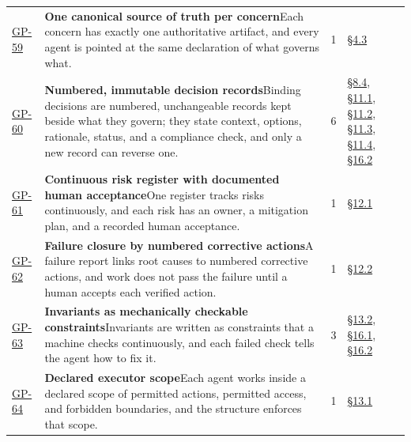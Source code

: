 \begin{longtable}{@{}p{} p{} r p{}@{}}
\hyperlink{gp-59}{GP-59}\hypertarget{gp-59}{} & \textbf{One canonical source of truth per concern}\newline Each concern has exactly one authoritative artifact, and every agent is pointed at the same declaration of what governs what.\rule[-\normalbaselineskip]{0pt}{0pt} & 1 & \hyperlink{nss-4.3}{\S4.3}\rule[-\normalbaselineskip]{0pt}{0pt} \\
\hyperlink{gp-60}{GP-60}\hypertarget{gp-60}{} & \textbf{Numbered, immutable decision records}\newline Binding decisions are numbered, unchangeable records kept beside what they govern; they state context, options, rationale, status, and a compliance check, and only a new record can reverse one.\rule[-\normalbaselineskip]{0pt}{0pt} & 6 & \hyperlink{nss-8.4}{\S8.4}, \hyperlink{nss-11.1}{\S11.1}, \hyperlink{nss-11.2}{\S11.2}, \hyperlink{nss-11.3}{\S11.3}, \hyperlink{nss-11.4}{\S11.4}, \hyperlink{nss-16.2}{\S16.2}\rule[-\normalbaselineskip]{0pt}{0pt} \\
\hyperlink{gp-61}{GP-61}\hypertarget{gp-61}{} & \textbf{Continuous risk register with documented human acceptance}\newline One register tracks risks continuously, and each risk has an owner, a mitigation plan, and a recorded human acceptance.\rule[-\normalbaselineskip]{0pt}{0pt} & 1 & \hyperlink{nss-12.1}{\S12.1}\rule[-\normalbaselineskip]{0pt}{0pt} \\
\hyperlink{gp-62}{GP-62}\hypertarget{gp-62}{} & \textbf{Failure closure by numbered corrective actions}\newline A failure report links root causes to numbered corrective actions, and work does not pass the failure until a human accepts each verified action.\rule[-\normalbaselineskip]{0pt}{0pt} & 1 & \hyperlink{nss-12.2}{\S12.2}\rule[-\normalbaselineskip]{0pt}{0pt} \\
\hyperlink{gp-63}{GP-63}\hypertarget{gp-63}{} & \textbf{Invariants as mechanically checkable constraints}\newline Invariants are written as constraints that a machine checks continuously, and each failed check tells the agent how to fix it.\rule[-\normalbaselineskip]{0pt}{0pt} & 3 & \hyperlink{nss-13.2}{\S13.2}, \hyperlink{nss-16.1}{\S16.1}, \hyperlink{nss-16.2}{\S16.2}\rule[-\normalbaselineskip]{0pt}{0pt} \\
\hyperlink{gp-64}{GP-64}\hypertarget{gp-64}{} & \textbf{Declared executor scope}\newline Each agent works inside a declared scope of permitted actions, permitted access, and forbidden boundaries, and the structure enforces that scope.\rule[-\normalbaselineskip]{0pt}{0pt} & 1 & \hyperlink{nss-13.1}{\S13.1}\rule[-\normalbaselineskip]{0pt}{0pt} \\

\end{longtable}
